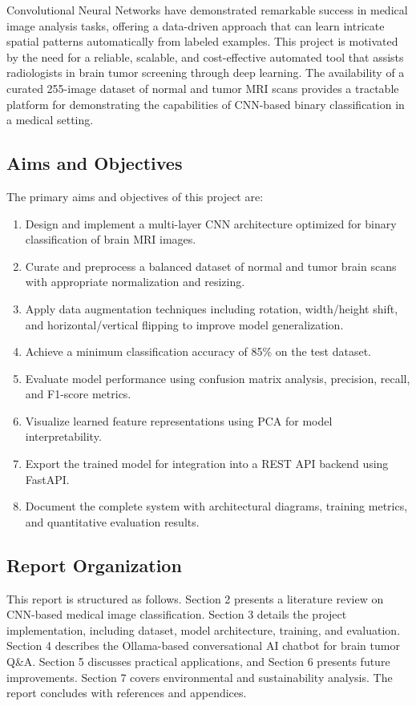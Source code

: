 \documentclass[12pt,a4paper]{article}
\begin{document}
Convolutional Neural Networks have demonstrated remarkable success in medical image analysis tasks, offering a data-driven approach that can learn intricate spatial patterns automatically from labeled examples. This project is motivated by the need for a reliable, scalable, and cost-effective automated tool that assists radiologists in brain tumor screening through deep learning. The availability of a curated 255-image dataset of normal and tumor MRI scans provides a tractable platform for demonstrating the capabilities of CNN-based binary classification in a medical setting.

\subsection{Aims and Objectives}

The primary aims and objectives of this project are:

\begin{enumerate}
    \item Design and implement a multi-layer CNN architecture optimized for binary classification of brain MRI images.
    \item Curate and preprocess a balanced dataset of normal and tumor brain scans with appropriate normalization and resizing.
    \item Apply data augmentation techniques including rotation, width/height shift, and horizontal/vertical flipping to improve model generalization.
    \item Achieve a minimum classification accuracy of 85\% on the test dataset.
    \item Evaluate model performance using confusion matrix analysis, precision, recall, and F1-score metrics.
    \item Visualize learned feature representations using PCA for model interpretability.
    \item Export the trained model for integration into a REST API backend using FastAPI.
    \item Document the complete system with architectural diagrams, training metrics, and quantitative evaluation results.
\end{enumerate}

\subsection{Report Organization}

This report is structured as follows. Section 2 presents a literature review on CNN-based medical image classification. Section 3 details the project implementation, including dataset, model architecture, training, and evaluation. Section 4 describes the Ollama-based conversational AI chatbot for brain tumor Q\&A. Section 5 discusses practical applications, and Section 6 presents future improvements. Section 7 covers environmental and sustainability analysis. The report concludes with references and appendices.
\end{document}
